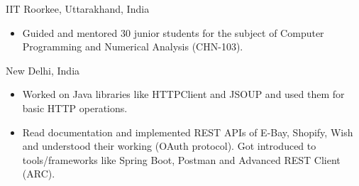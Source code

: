 \documentclass[10pt,a4paper,ragged2e]{altacv}
\begin{document}
  {IIT Roorkee, Uttarakhand, India}
\begin{itemize}
\item{ Guided and mentored 30 junior students for the subject of Computer Programming and Numerical Analysis (CHN-103).}
\end{itemize}
\divider




     {New Delhi, India}
\begin{itemize}
\item Worked on Java libraries like HTTPClient and JSOUP and used them for basic HTTP operations.
\item Read documentation and implemented REST APIs of E-Bay, Shopify, Wish and understood their working (OAuth
protocol). Got introduced to tools/frameworks like Spring Boot, Postman and Advanced REST Client (ARC).
\end{itemize}
\divider






\end{document}
